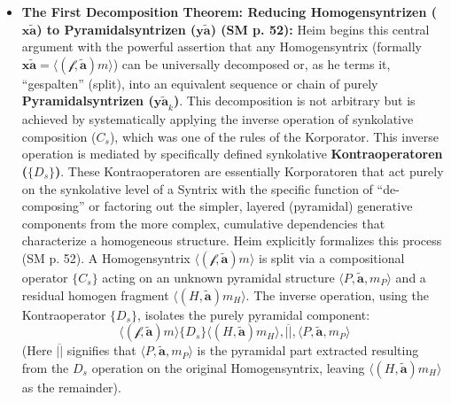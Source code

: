 \documentclass[12pt]{article}
\newcommand{\q}[1]{\enquote{#1}}
\newcommand{\syntrix}{\bm{y\widetilde{a}}}
\newcommand{\homogeneoussyntrix}{\bm{x\widetilde{a}}}
\newcommand{\metrophor}{\bm{\widetilde{a}}}
\newcommand{\synkolator}{\mathcal{f}}
\newcommand{\synkolationsstufe}{m}
\begin{document}
\begin{itemize}
    \item \textbf{The First Decomposition Theorem: Reducing Homogensyntrizen (\(\homogeneoussyntrix\)) to Pyramidalsyntrizen (\(\syntrix\)) (SM p. 52):}
    Heim begins this central argument with the powerful assertion that any Homogensyntrix (formally \( \homogeneoussyntrix = \langle(\synkolator,\metrophor)\synkolationsstufe\rangle \)) can be universally decomposed or, as he terms it, \q{gespalten} (split), into an equivalent sequence or chain of purely \textbf{Pyramidalsyntrizen (\( \syntrix_k \))}. This decomposition is not arbitrary but is achieved by systematically applying the inverse operation of synkolative composition (\( C_s \)), which was one of the rules of the Korporator. This inverse operation is mediated by specifically defined synkolative \textbf{Kontraoperatoren (\( \{D_s\} \))}. These Kontraoperatoren are essentially Korporatoren that act purely on the synkolative level of a Syntrix with the specific function of \q{de-composing} or factoring out the simpler, layered (pyramidal) generative components from the more complex, cumulative dependencies that characterize a homogeneous structure.
    Heim explicitly formalizes this process (SM p. 52). A Homogensyntrix \( \langle(\synkolator,\metrophor)\synkolationsstufe\rangle \) is split via a compositional operator \(\{C_s\}\) acting on an unknown pyramidal structure \(\langle P,\metrophor,\synkolationsstufe_P\rangle\) and a residual homogen fragment \(\langle (H,\metrophor)\synkolationsstufe_H\rangle\). The inverse operation, using the Kontraoperator \(\{D_s\}\), isolates the purely pyramidal component:
    \[ \langle (\synkolator, \metrophor) \synkolationsstufe \rangle \{D_s\} \langle (H, \metrophor) \synkolationsstufe_H \rangle, \overline{||}, \langle P, \metrophor, \synkolationsstufe_P \rangle \]
    (Here \( \overline{||} \) signifies that \( \langle P, \metrophor, \synkolationsstufe_P \rangle \) is the pyramidal part extracted resulting from the \(D_s\) operation on the original Homogensyntrix, leaving \( \langle(H,\metrophor)\synkolationsstufe_H\rangle \) as the remainder).


\end{itemize}
\end{document}
